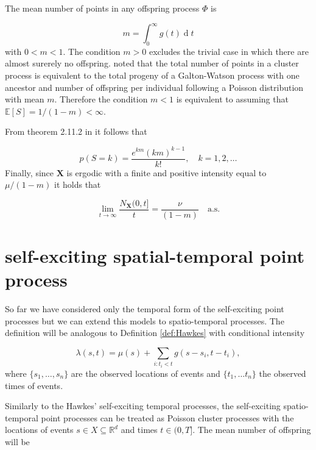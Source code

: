 \documentclass[11pt,a4paper]{article}
\renewcommand{\d}[1]{\ensuremath{\operatorname{d}\!{#1}}}
\begin{document}
The mean number of points in any offspring process $\Phi$ is

\begin{equation*}
    m = \int_0^\infty g(t) \d t
\end{equation*}
with $0 < m < 1$.
The condition $m > 0$ excludes the trivial case in which there are almost surerely no offspring.
\cite{Hawkes74} noted that the total number of points in a cluster process is equivalent to the total progeny of a Galton-Watson process with one ancestor and number of offspring per individual following a Poisson distribution with mean $m$. Therefore the condition $m < 1$ is equivalent to assuming that $\mathbb{E}[S] = 1/(1 - m) < \infty$.

From theorem 2.11.2 in \cite{Jagers} it follows that

\begin{equation*}
    p(S = k) = \frac{e^{km}(km)^{k-1}}{k!}, \quad k = 1, 2, \dots
\end{equation*}
Finally, since $\bm{X}$ is ergodic with a finite and positive intensity equal to $\mu/(1 - m)$ it holds that

\begin{equation*}
    \lim_{t \rightarrow \infty}\frac{N_{\bm{X}}(0, t]}{t} = \frac{\nu}{(1 - m)} \quad \text{a.s.}
\end{equation*}






\section{self-exciting spatial-temporal point process}

So far we have considered only the temporal form of the self-exciting point processes but we can extend this models to spatio-temporal processes. The definition will be analogous to Definition \ref{def:Hawkes} with conditional intensity

\begin{equation*}
    \lambda(s, t) = \mu(s) + \sum_{i:t_i<t} g(s - s_i, t - t_i),
\end{equation*}
where $\{ s_1, \dots, s_n \}$ are the observed locations of events and $\{t_1, \dots t_n \}$ the observed times of events. 

Similarly to the Hawkes' self-exciting temporal processes, the self-exciting spatio-temporal point processes can be treated as Poisson cluster processes with the locations of events $s \in X \subseteq \mathbb{R}^d$ and times $t \in (0, T]$. The mean number of offspring will be
\end{document}
